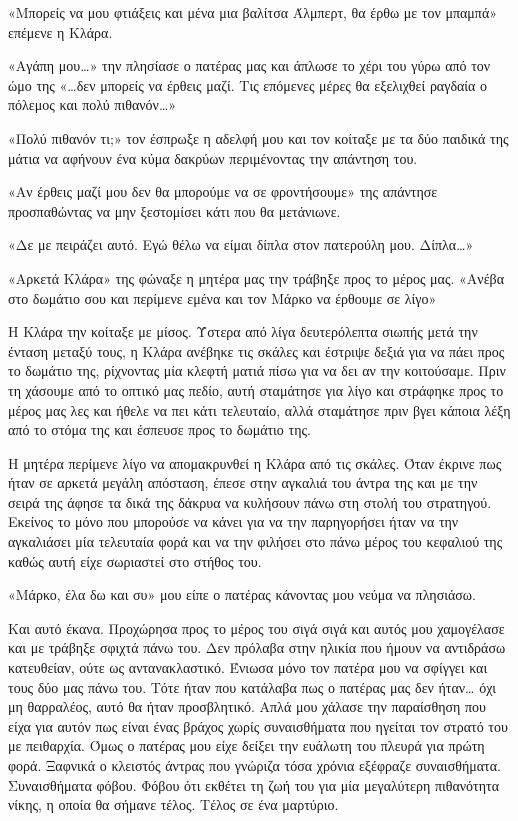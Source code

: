 \documentclass[12pt,twoside, openany]{book}
\begin{document}
«Μπορείς να μου φτιάξεις και μένα μια βαλίτσα Άλμπερτ, θα έρθω με τον μπαμπά» επέμενε η Κλάρα.

«Αγάπη μου…» την πλησίασε ο πατέρας μας και άπλωσε το χέρι του γύρω από τον ώμο της «…δεν μπορείς να έρθεις μαζί. Τις επόμενες μέρες θα εξελιχθεί ραγδαία ο πόλεμος και πολύ πιθανόν…»

«Πολύ πιθανόν τι;» τον έσπρωξε η αδελφή μου και τον κοίταξε με τα δύο παιδικά της μάτια να αφήνουν ένα κύμα δακρύων περιμένοντας την απάντηση του.

«Αν έρθεις μαζί μου δεν θα μπορούμε να σε φροντήσουμε» της απάντησε προσπαθώντας να μην ξεστομίσει κάτι που θα μετάνιωνε.

«Δε με πειράζει αυτό. Εγώ θέλω να είμαι δίπλα στον πατερούλη μου. Δίπλα…»

«Αρκετά Κλάρα» της φώναξε η μητέρα μας την τράβηξε προς το μέρος μας. «Ανέβα στο δωμάτιο σου και περίμενε εμένα και τον Μάρκο να έρθουμε σε λίγο»

Η Κλάρα την κοίταξε με μίσος. Ύστερα από λίγα δευτερόλεπτα σιωπής μετά την ένταση μεταξύ τους, η Κλάρα ανέβηκε τις σκάλες και έστριψε δεξιά για να πάει προς το δωμάτιο της, ρίχνοντας μία κλεφτή ματιά πίσω για να δει αν την κοιτούσαμε. Πριν τη χάσουμε από το οπτικό μας πεδίο, αυτή σταμάτησε για λίγο και στράφηκε προς το μέρος μας λες και ήθελε να πει κάτι τελευταίο, αλλά σταμάτησε πριν βγει κάποια λέξη από το στόμα της και έσπευσε προς το δωμάτιο της.

Η μητέρα περίμενε λίγο να απομακρυνθεί η Κλάρα από τις σκάλες. Όταν έκρινε πως ήταν σε αρκετά μεγάλη απόσταση, έπεσε στην αγκαλιά του άντρα της και με την σειρά της άφησε τα δικά της δάκρυα να κυλήσουν πάνω στη στολή του στρατηγού. Εκείνος το μόνο που μπορούσε να κάνει για να την παρηγορήσει ήταν να την αγκαλιάσει μία τελευταία φορά και να την φιλήσει στο πάνω μέρος του κεφαλιού της καθώς αυτή είχε σωριαστεί στο στήθος του.

«Μάρκο, έλα δω και συ» μου είπε ο πατέρας κάνοντας μου νεύμα να πλησιάσω.

Και αυτό έκανα. Προχώρησα προς το μέρος του σιγά σιγά και αυτός μου χαμογέλασε και με τράβηξε σφιχτά πάνω του. Δεν πρόλαβα στην ηλικία που ήμουν να αντιδράσω κατευθείαν, ούτε ως αντανακλαστικό. Ένιωσα μόνο τον πατέρα μου να σφίγγει και τους δύο μας πάνω του. Τότε ήταν που κατάλαβα πως ο πατέρας μας δεν ήταν… όχι μη θαρραλέος, αυτό θα ήταν προσβλητικό. Απλά μου χάλασε την παραίσθηση που είχα για αυτόν πως είναι ένας βράχος χωρίς συναισθήματα που ηγείται τον στρατό του με πειθαρχία. Όμως ο πατέρας μου είχε δείξει την ευάλωτη του πλευρά για πρώτη φορά. Ξαφνικά ο κλειστός άντρας που γνώριζα τόσα χρόνια εξέφραζε συναισθήματα. Συναισθήματα φόβου. Φόβου ότι εκθέτει τη ζωή του για μία μεγαλύτερη πιθανότητα νίκης, η οποία θα σήμανε τέλος. Τέλος σε ένα μαρτύριο.
\end{document}

